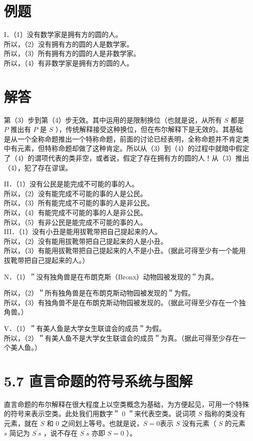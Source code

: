 \section*{例题}
I．（1）没有数学家是拥有方的圆的人。\\
所以，（2）没有拥有方的圆的人是数学家。\\
所以，（3）所有拥有方的圆的人是非数学家。\\
所以，（4）有非数学家是拥有方的圆的人。

\section*{解答}
第（3）步到第（4）步无效。其中运用的是限制换位（也就是说，从所有 $S$ 都是 $P$ 推出有 $P$ 是 $S$ ），传统解释接受这种换位，但在布尔解释下是无效的。其基础是从一个全称命题推出一个特称命题，前面的讨论已经表明，全称命题并不肯定类中有元素，但特称命题却做了这种肯定。所以从（3）到（4）的过程中就暗中假定了（4）的谓项代表的类非空，或者说，假定了存在拥有方的圆的人！从（3）推出（4），犯了存在谬误。

II．（1）没有公民是能完成不可能的事的人。\\
所以，（2）没有能完成不可能的事的人是公民。\\
所以，（3）所有能完成不可能的事的人是非公民。\\
所以，（4）有能完成不可能的事的人是非公民。\\
所以，（5）有非公民是能完成不可能的事的人。\\
III．（1）没有小丑是能用拔靴带把自己提起来的人。\\
所以，（2）没有能用拔靴带把自己提起来的人是小丑。\\
所以，（3）有能用拔靴带把自己提起来的人不是小丑。（据此可得至少有一个能用拔靴带把自己提起来的人。）

N．（1）＂没有独角兽是在布朗克斯（Bronx）动物园被发现的＂为真。

所以，（2）＂所有独角兽是在布朗克斯动物园被发现的＂为假。\\
所以，（3）有独角兽不是在布朗克斯动物园被发现的。（据此可得至少存在一个独角兽。）

V．（1）＂有美人鱼是大学女生联谊会的成员＂为假。\\
所以，（2）＂有美人鱼不是大学女生联谊会的成员＂为真。（据此可得至少存在一个美人鱼。）

\section*{5.7 直言命题的符号系统与图解}
直言命题的布尔解释在很大程度上以空类概念为基础，为方便起见，可用一个特殊的符号来表示空类。此处我们用数字＂ 0 ＂来代表空类。说词项 $S$ 指称的类没有元素，就在 $S$ 和 0 之间划上等号。也就是说，$S=0$表示 $S$ 没有元素（ $S$ 的元素 $s$ 简记为 $S^{\prime} s$ ，说不存在 $S^{\prime} s$ 亦即 $S=0$ ）。

